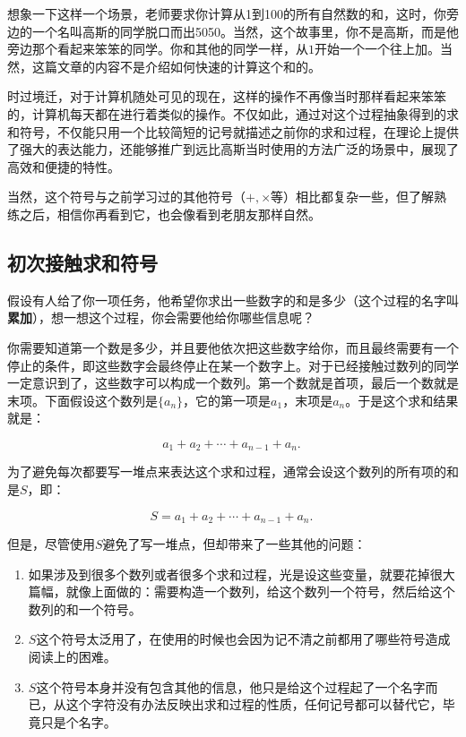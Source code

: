 
\begin{issues}
\issueDraft
\end{issues}


想象一下这样一个场景，老师要求你计算从1到100的所有自然数的和，这时，你旁边的一个名叫高斯的同学脱口而出5050。当然，这个故事里，你不是高斯，而是他旁边那个看起来笨笨的同学。你和其他的同学一样，从$1$开始一个一个往上加。当然，这篇文章的内容不是介绍如何快速的计算这个和的。

时过境迁，对于计算机随处可见的现在，这样的操作不再像当时那样看起来笨笨的，计算机每天都在进行着类似的操作。不仅如此，通过对这个过程抽象得到的求和符号，不仅能只用一个比较简短的记号就描述之前你的求和过程，在理论上提供了强大的表达能力，还能够推广到远比高斯当时使用的方法广泛的场景中，展现了高效和便捷的特性。

当然，这个符号与之前学习过的其他符号（$+,\times$等）相比都复杂一些，但了解熟练之后，相信你再看到它，也会像看到老朋友那样自然。


\subsection{初次接触求和符号}

假设有人给了你一项任务，他希望你求出一些数字的和是多少（这个过程的名字叫\textbf{累加}），想一想这个过程，你会需要他给你哪些信息呢？

你需要知道第一个数是多少，并且要他依次把这些数字给你，而且最终需要有一个停止的条件，即这些数字会最终停止在某一个数字上。对于已经接触过数列的同学一定意识到了，这些数字可以构成一个数列。第一个数就是首项，最后一个数就是末项。下面假设这个数列是$\{a_n\}$，它的第一项是$a_1$，末项是$a_n$。于是这个求和结果就是：

\begin{equation}
a_1+a_2+\cdots+a_{n-1}+a_{n}.~
\end{equation}

为了避免每次都要写一堆点来表达这个求和过程，通常会设这个数列的所有项的和是$S$，即：

\begin{equation}
S=a_1+a_2+\cdots+a_{n-1}+a_{n}.~
\end{equation}

但是，尽管使用$S$避免了写一堆点，但却带来了一些其他的问题：
\begin{enumerate}
\item 如果涉及到很多个数列或者很多个求和过程，光是设这些变量，就要花掉很大篇幅，就像上面做的：需要构造一个数列，给这个数列一个符号，然后给这个数列的和一个符号。
\item $S$这个符号太泛用了，在使用的时候也会因为记不清之前都用了哪些符号造成阅读上的困难。
\item $S$这个符号本身并没有包含其他的信息，他只是给这个过程起了一个名字而已，从这个字符没有办法反映出求和过程的性质，任何记号都可以替代它，毕竟只是个名字。
\end{enumerate}


